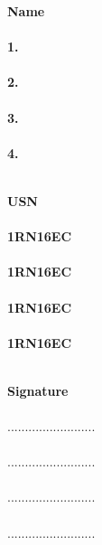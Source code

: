 \vspace{1.5cm}
\begin{minipage}[t]{0.45\textwidth}%

\textbf{\hspace{1.5cm}Name\\\\
1. \\\\
2. \\\\
3. \\\\
4. \\\\
}
\end{minipage}\hspace{0.4cm}
\begin{minipage}[t]{0.3\textwidth}%

\textbf{\hspace{0.7cm}USN\\\\
1RN16EC \\\\
1RN16EC \\\\
1RN16EC \\\\
1RN16EC \\\\
}
\end{minipage}
\begin{minipage}[t]{0.3\textwidth}%

\textbf{\hspace{0.2cm}Signature}\\\\
\small{\color{gray!35}.........................}\\\\
\small{\color{gray!35}.........................}\\\\
\small{\color{gray!35}.........................}\\\\
\small{\color{gray!35}.........................}\\\\
\end{minipage}
